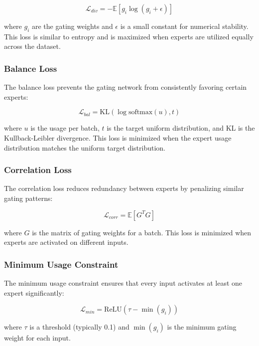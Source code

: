 \documentclass[conference]{IEEEtran}
\begin{document}
\begin{equation}
\mathcal{L}_{div} = -\mathbb{E}[g_i \log(g_i + \epsilon)]
\end{equation}

where $g_i$ are the gating weights and $\epsilon$ is a small constant for numerical stability. This loss is similar to entropy and is maximized when experts are utilized equally across the dataset.

\subsubsection{Balance Loss}
The balance loss prevents the gating network from consistently favoring certain experts:

\begin{equation}
\mathcal{L}_{bal} = \text{KL}(\log\text{softmax}(u), t)
\end{equation}

where $u$ is the usage per batch, $t$ is the target uniform distribution, and KL is the Kullback-Leibler divergence. This loss is minimized when the expert usage distribution matches the uniform target distribution.

\subsubsection{Correlation Loss}
The correlation loss reduces redundancy between experts by penalizing similar gating patterns:

\begin{equation}
\mathcal{L}_{corr} = \mathbb{E}[G^T G]
\end{equation}

where $G$ is the matrix of gating weights for a batch. This loss is minimized when experts are activated on different inputs.

\subsubsection{Minimum Usage Constraint}
The minimum usage constraint ensures that every input activates at least one expert significantly:

\begin{equation}
\mathcal{L}_{min} = \text{ReLU}(\tau - \min(g_i))
\end{equation}

where $\tau$ is a threshold (typically 0.1) and $\min(g_i)$ is the minimum gating weight for each input.
\end{document}

